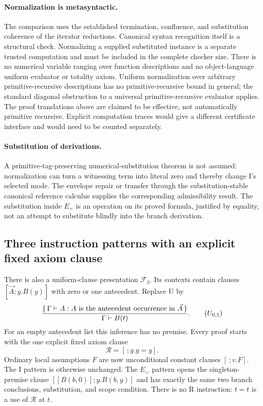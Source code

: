 \paragraph{Normalization is metasyntactic.}
The comparison uses the established termination, confluence, and
substitution coherence of the iterator reductions. Canonical syntax
recognition itself is a structural check. Normalizing a supplied substituted
instance is a separate trusted computation and must be included in the
complete checker size. There is no numerical variable ranging over function
descriptions and no object-language uniform evaluator or totality axiom.
Uniform normalization over arbitrary primitive-recursive descriptions has
no primitive-recursive bound in general; the standard diagonal obstruction
to a universal primitive-recursive evaluator applies. The proof translations
above are claimed to be effective, not automatically primitive recursive.
Explicit computation traces would give a different certificate interface
and would need to be counted separately.

\paragraph{Substitution of derivations.}
A primitive-tag-preserving numerical-substitution theorem is not assumed:
normalization can turn a witnessing term into literal zero and thereby
change I's selected mode. The envelope repair or transfer through the
substitution-stable canonical reference calculus supplies the corresponding
admissibility result. The substitution inside $E_{=}$ is an operation on
its proved formula, justified by equality, not an attempt to substitute
blindly into the branch derivation.

\subsection{Three instruction patterns with an explicit fixed axiom clause}
\label{fus:three}

There is also a uniform-clause presentation $\mathcal F_3$. Its contexts
contain clauses $[\vec A;y.B(y)]$ with zero or one antecedent. Replace U by
\[
 \frac{\{\,\Gamma\vdash A:A\text{ is the antecedent occurrence in }\vec A\,\}}
      {\Gamma\vdash B(t)}.
\tag{$U_{0,1}$}\label{fus:uniform-use}
\]
For an empty antecedent list this inference has no premise. Every proof
starts with the one explicit fixed axiom clause
\[
             \mathcal R=[\,;y.y=y].\tag{Ax}\label{fus:axiom}
\]
Ordinary local assumptions $F$ are now unconditional constant clauses
$[\,;v.F]$. The I pattern is otherwise unchanged. The $E_{=}$ pattern opens
the singleton-premise clause $[[B(b,0)];y.B(b,y)]$ and has exactly the same
two branch conclusions, substitution, and scope condition. There is no R
instruction: $t=t$ is a use of $\mathcal R$ at $t$.

